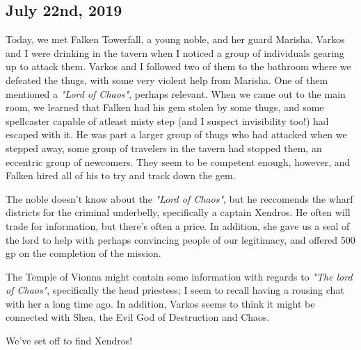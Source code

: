 \subsection{July 22nd, 2019}

{\Fontauri
Today, we met Falken Towerfall, a young noble, and her guard Marisha. Varkos and
I were drinking in the tavern when I noticed a group of individuals gearing up
to attack them. Varkos and I followed two of them to the bathroom where we
defeated the thugs, with some very violent help from Marisha. One of them
mentioned a \textit{"Lord of Chaos"}, perhaps relevant. When we came out to the
main room, we learned that Falken had his gem stolen by some thugs, and some
spellcaster capable of atleast misty step (and I suspect invisibility too!) had
escaped with it. He was part a larger group of thugs who had attacked when we
stepped away, some group of travelers in the tavern had stopped them, an
eccentric group of newcomers. They seem to be competent enough, however, and
Falken hired all of his to try and track down the gem.

The noble doesn't know about the \textit{"Lord of Chaos"}, but he reccomends the
wharf districts for the criminal underbelly, specifically a captain Xendros. He
often will trade for information, but there's often a price. In addition, she
gave us a seal of the lord to help with perhaps convincing people of our
legitimacy, and offered 500 gp on the completion of the mission.

The Temple of Vionna might contain some information with regards to \textit{"The
lord of Chaos"}, specifically the head priestess; I seem to recall having
a rousing chat with her a long time ago. In addition, Varkos seems to think it
might be connected with Shea, the Evil God of Destruction and Chaos. 

We've set off to find Xendros!
}
